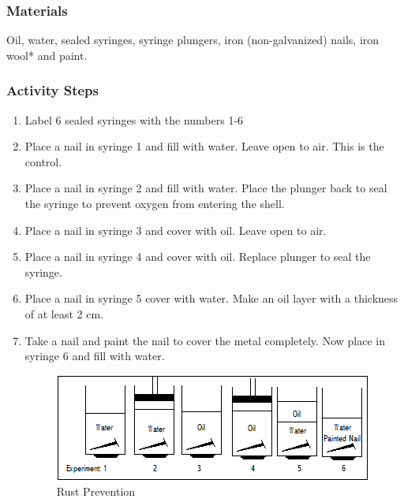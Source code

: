 \subsubsection*{Materials}
Oil, water, sealed syringes, syringe plungers, iron (non-galvanized) nails, iron wool* and paint.

\subsubsection*{Activity Steps}
\begin{enumerate}
\item{Label 6 sealed syringes with the numbers 1-6}
\item{Place a nail in syringe 1 and fill with water. Leave open to air. This is the control.}
\item{Place a nail in syringe 2 and fill with water. Place the plunger back to seal the syringe to prevent oxygen from entering the shell.}
\item{Place a nail in syringe 3 and cover with oil. Leave open to air.}
\item{Place a nail in syringe 4 and cover with oil. Replace plunger to seal the syringe.}
\item{Place a nail in syringe 5 cover with water. Make an oil layer with a thickness of at least 2 cm.}
\item{Take a nail and paint the nail to cover the metal completely. Now place in syringe 6 and fill with water.}
\begin{figure}[h]
\begin{center}
\includegraphics[scale=0.75]{../img/rust-prevention.png}
\caption{Rust Prevention}
\end{center}
\end{figure}


\end{enumerate}



